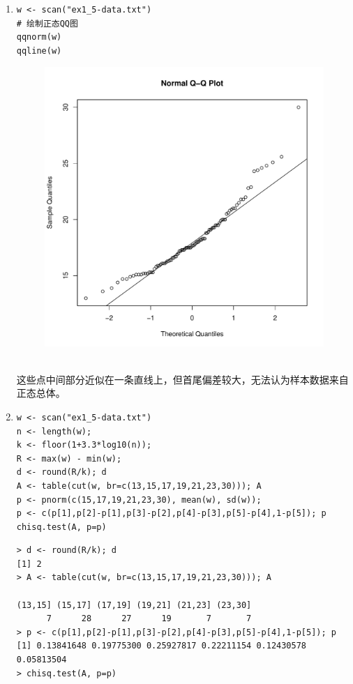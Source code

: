 \begin{enumerate}
        \item
        \code
\begin{lstlisting}
w <- scan("ex1_5-data.txt")
# 绘制正态QQ图
qqnorm(w)
qqline(w)
\end{lstlisting}
        \clearpage
        \out
        \begin{figure}[H]
            \centering
            \includegraphics[scale=0.5]{1-7.pdf}
        \end{figure}
        \summary\\
        这些点中间部分近似在一条直线上，但首尾偏差较大，无法认为样本数据来自正态总体。
        \item
        \code
\begin{lstlisting}
w <- scan("ex1_5-data.txt")
n <- length(w);
k <- floor(1+3.3*log10(n));
R <- max(w) - min(w);
d <- round(R/k); d
A <- table(cut(w, br=c(13,15,17,19,21,23,30))); A
p <- pnorm(c(15,17,19,21,23,30), mean(w), sd(w));
p <- c(p[1],p[2]-p[1],p[3]-p[2],p[4]-p[3],p[5]-p[4],1-p[5]); p
chisq.test(A, p=p)
\end{lstlisting}
        \out
\begin{lstlisting}
> d <- round(R/k); d
[1] 2
> A <- table(cut(w, br=c(13,15,17,19,21,23,30))); A

(13,15] (15,17] (17,19] (19,21] (21,23] (23,30] 
      7      28      27      19       7       7 
> p <- c(p[1],p[2]-p[1],p[3]-p[2],p[4]-p[3],p[5]-p[4],1-p[5]); p
[1] 0.13841648 0.19775300 0.25927817 0.22211154 0.12430578 0.05813504
> chisq.test(A, p=p)


\end{lstlisting}
\end{enumerate}
